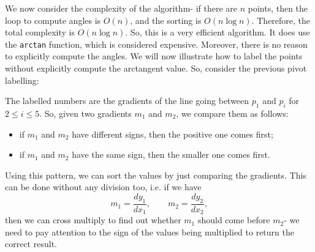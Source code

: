 \documentclass[a4paper, openany]{memoir}
\begin{document}
We now consider the complexity of the algorithm- if there are $n$ points, then the loop to compute angles is $O(n)$, and the sorting is $O(n \log n)$. Therefore, the total complexity is $O(n \log n)$. So, this is a very efficient algorithm. It does use the \texttt{arctan} function, which is considered expensive. Moreover, there is no reason to explicitly compute the angles. We will now illustrate how to label the points without explicitly compute the arctangent value. So, consider the previous pivot labelling:
\begin{figure}[H]
    \centering
\end{figure}
\noindent The labelled numbers are the gradients of the line going between $p_1$ and $p_i$ for $2 \leq i \leq 5$. So, given two gradients $m_1$ and $m_2$, we compare them as follows:
\begin{itemize}
    \item if $m_1$ and $m_2$ have different signs, then the positive one comes first;
    \item if $m_1$ and $m_2$ have the same sign, then the smaller one comes first.
\end{itemize}
Using this pattern, we can sort the values by just comparing the gradients. This can be done without any division too, i.e. if we have
\[m_1 = \frac{dy_1}{dx_1}, \qquad m_2 = \frac{dy_2}{dx_2},\]
then we can cross multiply to find out whether $m_1$ should come before $m_2$- we need to pay attention to the sign of the values being multiplied to return the correct result.
\end{document}
